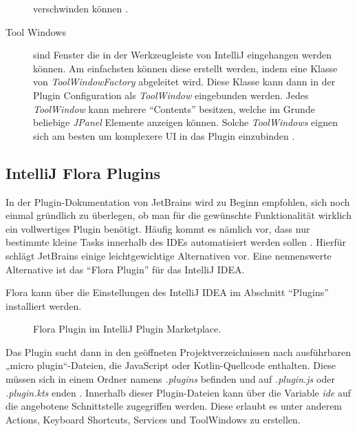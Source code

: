 \begin{description}
      verschwinden können \cite{IntelliJPlatformSDKNotifications}.
    \item[Tool Windows] sind Fenster die in der Werkzeugleiste von IntelliJ eingehangen
      werden können. Am einfachsten können diese erstellt werden, indem eine Klasse
      von \emph{ToolWindowFactory} abgeleitet wird. Diese Klasse kann dann 
      in der Plugin Configuration als \emph{ToolWindow} eingebunden werden. Jedes \emph{ToolWindow}
      kann mehrere \enquote{Contents} besitzen, welche im Grunde beliebige \emph{JPanel} 
      Elemente anzeigen können. Solche \emph{ToolWindows} eignen sich am besten um komplexere
      UI in das Plugin einzubinden \cite{IntelliJPlatformSDKToolWindows}.
  \end{description}

\subsection{IntelliJ Flora Plugins}

In der Plugin-Dokumentation von JetBrains wird zu Beginn 
empfohlen, sich noch einmal gründlich zu überlegen, ob man 
für die gewünschte Funktionalität wirklich ein 
vollwertiges Plugin benötigt. Häufig kommt es nämlich vor, 
dass nur bestimmte kleine Tasks innerhalb des IDEs 
automatisiert werden sollen \cite{IntelliJSDKDocumentation}. Hierfür schlägt JetBrains 
einige leichtgewichtige Alternativen vor. Eine nennenswerte 
Alternative ist das \enquote{Flora Plugin} für das IntelliJ IDEA. 

Flora kann über die Einstellungen des IntelliJ IDEA 
im Abschnitt \enquote{Plugins} installiert werden.

\begin{figure}
    \centering
    \caption{Flora Plugin im IntelliJ Plugin Marketplace.}
    \label{fig:FloraPlugin}
\end{figure}    
 
Das Plugin sucht dann in den geöffneten Projektverzeichnissen nach ausführbaren 
„micro plugin“-Dateien, die JavaScript oder Kotlin-Quellcode enthalten. 
Diese müssen sich in einem Ordner namens \emph{.plugins} 
befinden und auf \emph{.plugin.js}  oder \emph{.plugin.kts}  enden \cite{FloraPluginMarketplace}.
Innerhalb dieser Plugin-Dateien kann über die Variable \emph{ide} auf 
die angebotene Schnittstelle zugegriffen werden. Diese erlaubt 
es unter anderem Actions, Keyboard Shortcuts, Services und 
ToolWindows zu erstellen.

